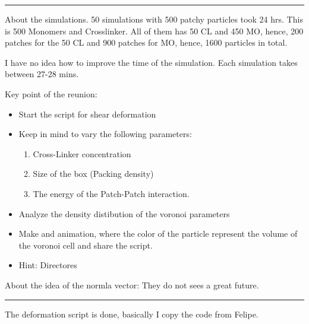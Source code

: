 \documentclass[a4paper, 11pt, oneside]{researchjournal} %
\begin{document}
\rule{\textwidth}{0.4pt}

About the simulations.
50 simulations with 500 patchy particles took 24 hrs.
This is 500 Monomers and Crosslinker. 
All of them has 50 CL and 450 MO, hence, 200 patches for the 50 CL and 900 patches for MO, hence, 1600 particles in total.

I have no idea how to improve the time of the simulation.
Each simulation takes between 27-28 mins. 

Key point of the reunion:
\begin{itemize}
	\item Start the script for shear deformation
	\item Keep in mind to vary the following parameters:
	\begin{enumerate}
		\item Cross-Linker concentration
		\item Size of the box (Packing density)
		\item The energy of the Patch-Patch interaction.
	\end{enumerate}
	\item Analyze the density distibution of the voronoi parameters
	\item Make and animation, where the color of the particle represent the volume of the voronoi cell and share the script.
	\item Hint: Directores
\end{itemize}

About the idea of the normla vector: They do not sees a great future.

\rule{\textwidth}{0.4pt}

The deformation script is done, basically I copy the code from Felipe.


\end{document}
